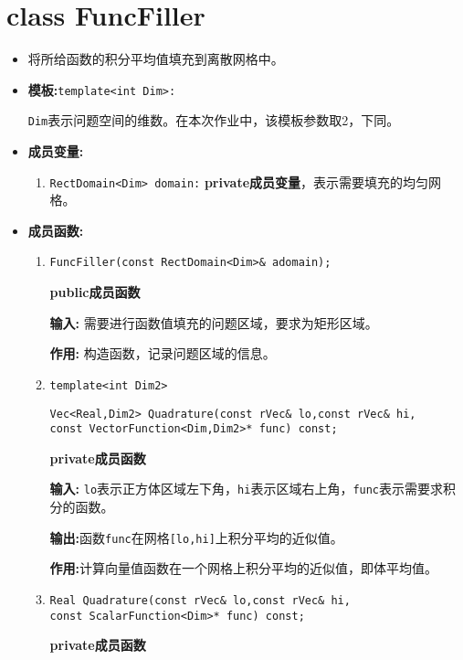 \documentclass[UTF8]{ctexart}
\theoremstyle{plain}
\theoremstyle{definition}
\theoremstyle{remark}
\begin{document}
\section{class FuncFiller}
\begin{itemize}
    \item 将所给函数的积分平均值填充到离散网格中。
    \item \textbf{模板:}\texttt{template<int Dim>:}
    
    \texttt{Dim}表示问题空间的维数。在本次作业中，该模板参数取2，下同。

    \item \textbf{成员变量:}
    \begin{enumerate}
        \item \texttt{RectDomain<Dim> domain:} \textbf{private成员变量}，表示需要填充的均匀网格。
    \end{enumerate}

    \item \textbf{成员函数:}
    \begin{enumerate}
        \item \texttt{FuncFiller(const RectDomain<Dim>\& adomain);}
        
        \textbf{public成员函数}
        
        \textbf{输入:} 需要进行函数值填充的问题区域，要求为矩形区域。

        \textbf{作用:} 构造函数，记录问题区域的信息。
        \item \texttt{template<int Dim2>}
        
        \texttt{Vec<Real,Dim2> Quadrature(const rVec\& lo,const rVec\& hi,\\const VectorFunction<Dim,Dim2>* func) const;}
        
        \textbf{private成员函数}
        
        \textbf{输入:} \texttt{lo}表示正方体区域左下角，\texttt{hi}表示区域右上角，\texttt{func}表示需要求积分的函数。

        \textbf{输出:}函数\texttt{func}在网格\texttt{[lo,hi]}上积分平均的近似值。

        \textbf{作用:}计算向量值函数在一个网格上积分平均的近似值，即体平均值。

        \item \texttt{Real Quadrature(const rVec\& lo,const rVec\& hi,\\const ScalarFunction<Dim>* func) const;}
        
        \textbf{private成员函数}
        

\end{enumerate}
\end{itemize}
\end{document}
